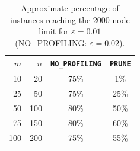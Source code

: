 \begin{table}[H]
\centering
\caption{Approximate percentage of instances reaching the 2000-node limit for $\varepsilon = 0.01$ (NO\_PROFILING: $\varepsilon = 0.02$).}
\label{tab:failure_e001}
\begin{tabular}{r r c c}
\hline
\(m\) & \(n\) & \texttt{NO\_PROFILING} & \texttt{PRUNE} \\
\hline
10  & 20  & 75\% & 1\% \\
25  & 50  & 75\% & 25\% \\
50  & 100 & 80\% & 50\% \\
75  & 150 & 80\% & 60\% \\
100 & 200 & 75\% & 55\% \\
\hline
\end{tabular}
\end{table}
